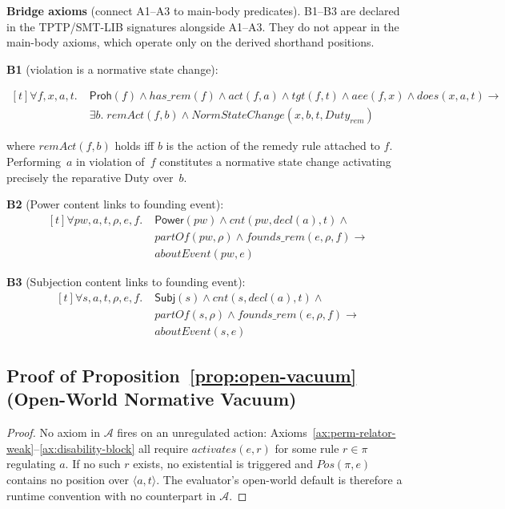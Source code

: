 \documentclass{IOS-Book-Article}
\newcommand{\activates}{\mathit{activates}}
\newcommand{\hasrem}{\mathit{has\_rem}}
\newcommand{\Power}{\mathsf{Power}}          %
\newcommand{\Subj}{\mathsf{Subj}}       %
\newcommand{\Proh}{\mathsf{Proh}}
\theoremstyle{definition}
\begin{document}
\medskip
\noindent\textbf{Bridge axioms} (connect A1--A3 to main-body
predicates). B1--B3 are declared in the TPTP/SMT-LIB
signatures alongside A1--A3. They do not appear in the
main-body axioms, which operate only on the derived shorthand
positions.

\medskip
\noindent\textbf{B1} (violation is a normative state change):

\[
\begin{aligned}[t]
\forall f,x,a,t.\;&
\Proh(f)\land\hasrem(f)\land\mathit{act}(f,a)\land
\mathit{tgt}(f,t)\land\mathit{aee}(f,x)\land
\mathit{does}(x,a,t)\to\\
&\exists b.\;\mathit{remAct}(f,b)\land
\mathit{NormStateChange}(x,b,t,\mathit{Duty}_\mathit{rem})
\end{aligned}
\]

where $\mathit{remAct}(f,b)$ holds iff $b$ is the action of
the remedy rule attached to $f$. Performing~$a$ in violation
of~$f$ constitutes a normative state change activating
precisely the reparative Duty over~$b$.
\medskip

\noindent\textbf{B2} (Power content links to founding event):
\[
\begin{aligned}[t]
\forall pw,a,t,\rho,e,f.\;&
\Power(pw)\land\mathit{cnt}(pw,\mathit{decl}(a),t)\land\\
&\mathit{partOf}(pw,\rho)\land\mathit{founds\_rem}(e,\rho,f)\to\\
&\mathit{aboutEvent}(pw,e)
\end{aligned}
\]

\noindent\textbf{B3} (Subjection content links to founding event):
\[
\begin{aligned}[t]
\forall s,a,t,\rho,e,f.\;&
\Subj(s)\land\mathit{cnt}(s,\mathit{decl}(a),t)\land\\
&\mathit{partOf}(s,\rho)\land\mathit{founds\_rem}(e,\rho,f)\to\\
&\mathit{aboutEvent}(s,e)
\end{aligned}
\]


\subsection*{Proof of Proposition~\ref{prop:open-vacuum}
  (Open-World Normative Vacuum)}
\label{app:proof:open-vacuum}
\begin{proof}
No axiom in $\mathcal{A}$ fires on an unregulated action:
Axioms~\ref{ax:perm-relator-weak}--\ref{ax:disability-block} all
require $\activates(e,r)$ for some rule $r\in\pi$ regulating $a$.
If no such $r$ exists, no existential is triggered and
$\mathit{Pos}(\pi,e)$ contains no position over $\langle a,t\rangle$.
The evaluator's open-world default is therefore a runtime convention
with no counterpart in $\mathcal{A}$.
\end{proof}
\end{document}
